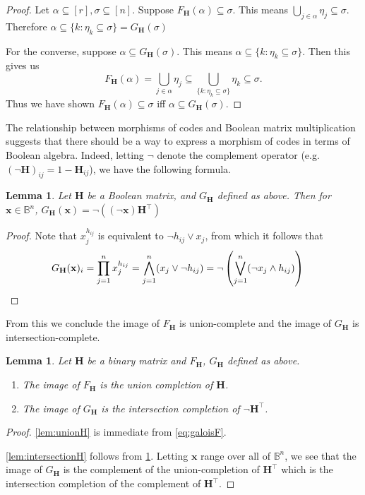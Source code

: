 \documentclass[11pt,letterpaper, reqno]{amsart}
\newtheorem{lem}[thm]{Lemma}         %
\theoremstyle{definition}
\def\B{\mathbb{B}}
\def\bx{\mathbf{x}}
\def\bH{\mathbf{H}}
\begin{document}
        \begin{proof}
            Let $\alpha \subseteq [r], \sigma \subseteq [n]$. Suppose $F_{\bH}(\alpha) \subseteq \sigma$. This means $\bigcup_{j\in\alpha} \eta_j \subseteq \sigma$. Therefore $\alpha \subseteq \{k : \eta_k \subseteq \sigma\} = G_{\bH}(\sigma)$

            
            For the converse, suppose $\alpha \subseteq G_\bH(\sigma)$. This means $\alpha \subseteq \{k : \eta_k \subseteq \sigma\}$. Then this gives us 
                \[ F_\bH(\alpha) = \bigcup_{j\in\alpha} \eta_j \subseteq \bigcup_{\{k: \eta_k \subseteq \sigma\}} \eta_k \subseteq \sigma.\]
            Thus we have shown $F_\bH(\alpha) \subseteq \sigma$ iff $\alpha \subseteq G_\bH(\sigma)$.
        \end{proof}

        The relationship between morphisms of codes and Boolean matrix multiplication suggests that there should be a way to express a morphism of codes in terms of Boolean algebra. Indeed, letting $\lnot$ denote the complement operator (e.g.\ $(\lnot\bH)_{ij} = 1 -\bH_{ij}$), we have the following formula.
        \begin{lem}\label{lem:morphismasmatrixoperations}
            Let $\bH$ be a Boolean matrix, and $G_\bH$ defined as above. Then for $\bx \in \B^n$, 
            $G_\bH(\bx) = \lnot((\lnot\bx)\bH^\top)$
        \end{lem}
        \begin{proof}
            Note that $x_j^{h_{ij}}$ is equivalent to $\lnot h_{ij} \vee x_j$, from which it follows that
            \begin{align*}
                G_\bH(\bx)_i = \prod_{j=1}^n x_j^{h_{ij}} & = \bigwedge_{j=1}^n (x_j \vee \lnot h_{ij})  = \lnot\left(\bigvee_{j=1}^n (\lnot x_j \wedge h_{ij})\right)\qedhere
            \end{align*}
        \end{proof}

        From this we conclude the image of $F_\bH$ is union-complete and the image of $G_\bH$ is intersection-complete.
        \begin{lem}\label{lem:images}
            Let $\bH$ be a binary matrix and $F_\bH$, $G_\bH$ defined as above.
            \begin{enumerate}
                \item\label{lem:unionH} The image of $F_\bH$ is the union completion of $\bH$.
                \item\label{lem:intersectionH} The image of $G_\bH$ is the intersection completion of $\lnot\bH^\top$.
            \end{enumerate}
        \end{lem}
        \begin{proof}
            \cref{lem:unionH} is immediate from \eqref{eq:galoisF}.

            \cref{lem:intersectionH} follows from \cref{lem:morphismasmatrixoperations}. Letting $\bx$ range over all of $\B^n$, we see that the image of $G_\bH$ is the complement of the union-completion of $\bH^\top$ which is the intersection completion of the complement of $\bH^\top$.
        \end{proof}
\end{document}
